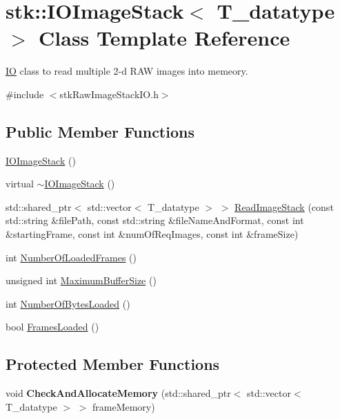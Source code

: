 \hypertarget{classstk_1_1IOImageStack}{
\section{stk::IOImageStack$<$ T\_\-datatype $>$ Class Template Reference}
\label{classstk_1_1IOImageStack}
}


\hyperlink{classstk_1_1IO}{IO} class to read multiple 2-\/d RAW images into memeory.  


{\ttfamily \#include $<$stkRawImageStackIO.h$>$}\subsection*{Public Member Functions}
\begin{DoxyCompactItemize}
\item 
\hyperlink{classstk_1_1IOImageStack_a6ffc3e1c1954bf3b09f42ced9f645743}{IOImageStack} ()
\item 
virtual \hyperlink{classstk_1_1IOImageStack_a802c8497a1ae2c74db74ccfacae8f128}{$\sim$IOImageStack} ()
\item 
std::shared\_\-ptr$<$ std::vector$<$ T\_\-datatype $>$ $>$ \hyperlink{classstk_1_1IOImageStack_ac66b6ab5e4b061fc6fbed2b98101a0bf}{ReadImageStack} (const std::string \&filePath, const std::string \&fileNameAndFormat, const int \&startingFrame, const int \&numOfReqImages, const int \&frameSize)
\item 
int \hyperlink{classstk_1_1IOImageStack_a8b107d1256c2d6c1b77297353c753ae9}{NumberOfLoadedFrames} ()
\item 
unsigned int \hyperlink{classstk_1_1IOImageStack_a17b0b767f58fab89564a20e9be012bf3}{MaximumBufferSize} ()
\item 
int \hyperlink{classstk_1_1IOImageStack_a25fbe1abf7b60046745581d1e657bb42}{NumberOfBytesLoaded} ()
\item 
bool \hyperlink{classstk_1_1IOImageStack_a2f6573c51109b983731eb78c5190ed6d}{FramesLoaded} ()
\end{DoxyCompactItemize}
\subsection*{Protected Member Functions}
\begin{DoxyCompactItemize}
\item 
\hypertarget{classstk_1_1IOImageStack_a6371de9675dcc773d09e1e36f1050969}{
void {\bfseries CheckAndAllocateMemory} (std::shared\_\-ptr$<$ std::vector$<$ T\_\-datatype $>$ $>$ frameMemory)}
\label{classstk_1_1IOImageStack_a6371de9675dcc773d09e1e36f1050969}

\end{DoxyCompactItemize}


